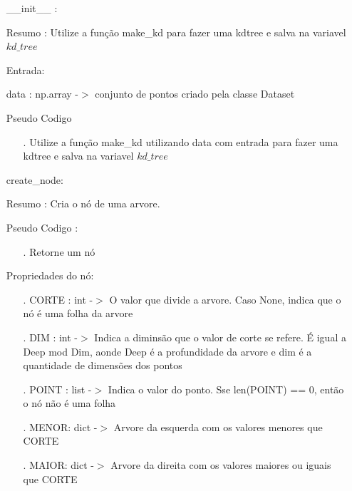 \documentclass{article}
\begin{document}
	\begin{enumerate}
	
	\item[] \_\_init\_\_ : 
	
		\quad Resumo : Utilize a função make\_kd para fazer uma kdtree e salva na variavel $kd\_tree$
	
		\quad Entrada: 
	
			\qquad data : np.array -$>$ conjunto de pontos criado pela classe Dataset
	
		\quad Pseudo Codigo
		
		\begin{enumerate}
	
		\item[.]Utilize a função make\_kd utilizando data com entrada para fazer uma kdtree e salva na variavel $kd\_tree$
	
		\end{enumerate}
	
	\item[] create\_node: 
	
		\quad Resumo : Cria o nó de uma arvore.
	
		\quad Pseudo Codigo :
		
		\begin{enumerate}
	
		\item[.] Retorne um nó
	
		\end{enumerate}

		\quad Propriedades do nó:

		\begin{enumerate}
	
		\item[.] CORTE : int -$>$ O valor que divide a arvore. Caso None, indica que o nó é uma folha da arvore
		\item[.] DIM : int -$>$ Indica a diminsão que o valor de corte se refere. É igual a Deep mod Dim, aonde Deep é a profundidade da arvore e dim é a quantidade de dimensões dos pontos
		\item[.] POINT : list -$>$ Indica o valor do ponto. Sse len(POINT) == 0, então o nó não é uma folha
		\item[.] MENOR: dict -$>$ Arvore da esquerda com os valores menores que CORTE
		\item[.] MAIOR: dict -$>$ Arvore da direita com os valores maiores ou iguais que CORTE

		\end{enumerate}
		

\end{enumerate}
\end{document}

